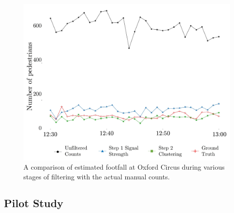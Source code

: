 \begin{figure}
  \includegraphics[trim={3 3 3 3},clip]{images/processing-oxst-results.jpg}
  \caption{A comparison of estimated footfall at Oxford Circus during various stages of filtering with the actual manual counts.}
  \label{figure:processing:oxst:results}
\end{figure}

\subsection{Pilot Study}

